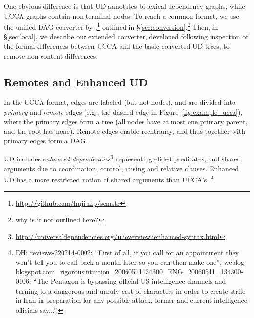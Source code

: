 \documentclass[11pt,a4paper]{article}
\newcommand{\daniel}[1]{\footnote{\color{blue}DH: #1}}
\begin{document}
One obvious difference is that UD annotates bi-lexical dependency graphs,
while UCCA graphs contain non-terminal nodes.
To reach a common format, we use the unified DAG converter by
\citet{hershcovich2018multitask,hershcovich2018universal},\footnote{\url{http://github.com/huji-nlp/semstr}}
outlined in \S\ref{sec:conversion}.\footnote{why is it not outlined here?}
Then, in \S\ref{sec:local}, we describe our extended converter,
developed following inspection of the formal differences between
UCCA and the basic converted UD trees,
to remove non-content differences.


\subsection{Remotes and Enhanced UD}\label{sec:remote}

In the UCCA format, edges are labeled (but not nodes),
and are divided into \textit{primary} and \textit{remote} edges
(e.g., the dashed edge in Figure~\ref{fig:example_ucca}),
where the primary edges form a tree (all nodes have at most one primary parent,
and the root has none).
Remote edges enable reentrancy, and thus together with primary edges form a DAG.

UD includes 
\textit{enhanced dependencies}\footnote{\url{http://universaldependencies.org/u/overview/enhanced-syntax.html}}
\cite{SCHUSTER16.779}
representing elided predicates,
and shared arguments due to coordination, control, raising and relative clauses.
Enhanced UD has a more restricted notion of shared arguments than UCCA's.
\daniel{reviews-220214-0002: ``First of all, if you call for an appointment they won't tell you to call back a month later so you can then make one'',
weblog-blogspot.com\_rigorousintuition\_20060511134300\_ENG\_20060511\_134300-0106:
``The Pentagon is bypassing official US intelligence channels and turning to a dangerous and unruly cast of characters in order to create strife in Iran in preparation for any possible attack, former and current intelligence officials say...''.}
\end{document}
